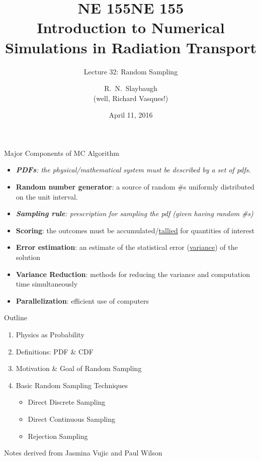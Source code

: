 \documentclass[xcolor=x11names,compress]{beamer}
\title{NE 155}
\author{R.\ N.\ Slaybaugh \\
(well, Richard Vasques!)}
\date{April 11, 2016}
\renewcommand{\(}{\begin{columns}}
\renewcommand{\)}{\end{columns}}
\newcommand{\<}[1]{\begin{column}{#1}}
\renewcommand{\>}{\end{column}}
\begin{document}
\begin{frame}
\title{NE 155\\Introduction to Numerical Simulations in Radiation Transport}
\subtitle{Lecture 32: Random Sampling}
\titlepage
\end{frame}


\begin{frame}{Major Components of MC Algorithm}

\begin{itemize}
  \item \textit{\textbf{PDFs}: the physical/mathematical system must be described by a set of pdfs.}
  \item \textbf{Random number generator}: a source of random \#s uniformly distributed on the unit interval.
  \item \textit{\textbf{Sampling rule}: prescription for sampling the pdf (given having random \#s)}
  \item \textbf{Scoring}: the outcomes must be accumulated/\underline{tallied} for quantities of interest
  \item \textbf{Error estimation}: an estimate of the statistical error (\underline{variance}) of the solution
  \item \textbf{Variance Reduction}: methods for reducing the variance and computation time simultaneously
  \item \textbf{Parallelization}: efficient use of computers
\end{itemize}
\end{frame}


\begin{frame}{Outline}

    \begin{enumerate}
    \item Physics as Probability
    \item Definitions: PDF \& CDF
    \item Motivation \& Goal of Random Sampling
    \item Basic Random Sampling Techniques
      \begin{itemize}
        \item Direct Discrete Sampling
        \item Direct Continuous Sampling
        \item Rejection Sampling
      \end{itemize}
    \end{enumerate}

\vspace*{1em}
Notes derived from Jasmina Vujic and Paul Wilson
\end{frame}
\end{document}
